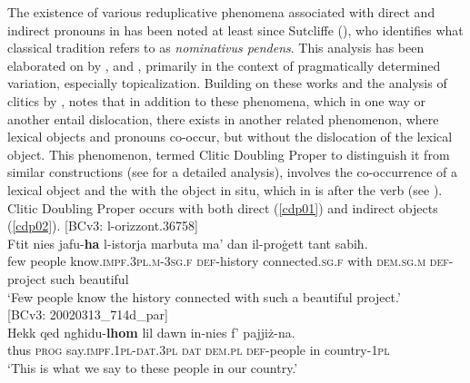 \documentclass[output=paper]{langsci/langscibook}
\begin{document}
The existence of various reduplicative phenomena associated with direct and indirect  pronouns in  has been noted at least since Sutcliffe (\citeyear[179]{sutcliffe}), who identifies what classical tradition refers to as \textit{nominativus pendens}. This analysis has been elaborated on by \cite{fabri1993}, \cite{BorgAzzopardi-Alexander1997} and \cite{fabriborgtopicfocus}, primarily in the context of pragmatically determined  variation, especially topicalization. Building on these works and the analysis of  clitics by \cite{camilleri2011}, \cite{bulbul2014} notes that in addition to these phenomena, which in one way or another entail dislocation, there exists in  another related phenomenon, where lexical objects and  pronouns co-occur, but without the dislocation of the lexical object. This phenomenon, termed Clitic Doubling Proper to distinguish it from similar constructions (see \citealt{krapovacinque2008} for a detailed analysis), involves the co-occurrence of a lexical object and the  with the object in situ, which in  is after the verb (see \citealt{bulbul2018}).  Clitic Doubling Proper occurs with both direct (\ref{cdp01}) and indirect objects (\ref{cdp02}).
\ea\label{cdp01}
{[BCv3: l-orizzont.36758]}\\
\gll Ftit nies jafu-\textbf{ha} l-istorja marbuta ma' dan il-proġett tant sabiħ.\\
	few people know.\textsc{impf.3pl.m}-\textsc{3sg.f} \textsc{def}-history connected.\textsc{sg.f} with \textsc{dem.sg.m} \textsc{def}-project such beautiful\\
	\glt `Few people know the history connected with such a beautiful project.'\\
\z
\ea\label{cdp02}
{[BCv3: 20020313\_714d\_par]}\\
\gll Hekk qed ngħidu-\textbf{lhom} lil dawn in-nies f' pajjiż-na.\\
	thus \textsc{prog} say.\textsc{impf.1pl}-\textsc{dat.3pl} \textsc{dat} \textsc{dem.pl} \textsc{def}-people in country-\textsc{1pl}\\
	\glt `This is what we say to these people in our country.'\\
\z
\end{document}
